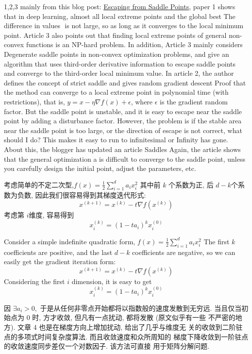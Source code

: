 \documentclass[UTF8]{ctexart}
\begin{document}
1,2,3 mainly from this blog post:
\href{http://www.offconvex.org/2016/03/22/saddlepoints/}{Escaping from Saddle Points}, paper 1 shows 
that in deep learning, almost all local extreme points and the global best The difference in values ​​
is not large, so as long as it converges to the local minimum point. Article 3 also points out that 
finding local extreme points of general non-convex functions is an NP-hard problem. In addition, 
Article 3 mainly considers Degenerate saddle points in non-convex optimization problems, and give 
an algorithm that uses third-order derivative information to escape saddle points and converge to 
the third-order local minimum value. In article 2, the author defines the concept of strict saddle 
and gives random gradient descent Proof that the method can converge to a local extreme point in polynomial 
time (with restrictions), that is, $y=x-\eta \nabla f(x)+\epsilon$, where $\epsilon$ is the gradient random 
factor.
But the saddle point is unstable, and it is easy to escape near the saddle point by adding a disturbance 
factor. However, the problem is if the stable area near the saddle point is too large, or the direction of 
escape is not correct, what should I do? This makes it easy to run to infinitesimal or Infinity has gone. 
About this, the blogger has updated an article Saddles Again, the article shows that the general optimization a
is difficult to converge to the saddle point, unless you carefully design the initial point, adjust the 
parameters, etc.

考虑简单的不定二次型,$f(x)=\frac{1}{2} \sum_{i=1}^{d} a_{i} x_{i}^{2}$
其中前 $k$ 个系数为正, 后
$d − k $个系数为负数, 因此我们很容易得到其梯度迭代形式:
$$x^{(k+1)}=x^{(k)}-t \nabla f\left(x^{(k)}\right)$$
考虑第 $i $维度, 容易得到
$$x_{i}^{(k)}=\left(1-t a_{i}\right)^{k} x_{i}^{(0)}$$

Consider a simple indefinite quadratic form, $f(x)=\frac{1}{2} \sum_{i=1}^{d} a_{i} x_{i}^{2}$
The first $k$ coefficients are positive, and the last $d − k $ coefficients are negative, so we can 
easily get the gradient iteration form: $$x^{(k+1)}=x^{(k)} -t \nabla f\left(x^{(k)}\right)$$
Considering the first $i $ dimension, it is easy to get
$$x_{i}^{(k)}=\left(1-t a_{i}\right)^{k} x_{i}^{(0)}$$


因 $\exists a_i > 0,$ 于是从任何非零点开始都将以指数般的速度发散到无穷远. 
当且仅当初始点为 0 时, 方才收敛, 但凡有一点扰动, 都将发散 (原文似乎有一些
不严密的地方). 文章 4 也是在梯度方向上增加扰动, 给出了几乎与维度无
关的收敛到二阶驻点的多项式时间复杂度算法. 而且收敛速度和众所周知的
梯度下降收敛到一阶驻点的收敛速度同步差仅一个对数因子. 该方法可直接
用于矩阵分解问题. 
\end{document}
